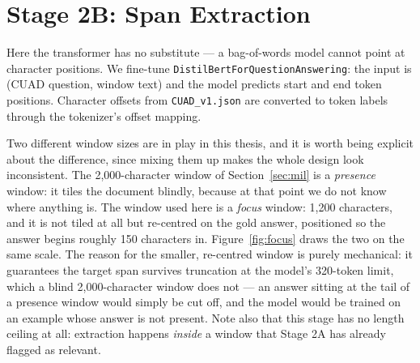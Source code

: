 \section{Stage 2B: Span Extraction}
Here the transformer has no substitute --- a bag-of-words model cannot point at character positions. We fine-tune \texttt{DistilBertForQuestionAnswering}: the input is (CUAD question, window text) and the model predicts start and end token positions. Character offsets from \texttt{CUAD\_v1.json} are converted to token labels through the tokenizer's offset mapping.

Two different window sizes are in play in this thesis, and it is worth being explicit about the difference, since mixing them up makes the whole design look inconsistent. The 2{,}000-character window of Section~\ref{sec:mil} is a \emph{presence} window: it tiles the document blindly, because at that point we do not know where anything is. The window used here is a \emph{focus} window: 1{,}200 characters, and it is not tiled at all but re-centred on the gold answer, positioned so the answer begins roughly 150 characters in. Figure~\ref{fig:focus} draws the two on the same scale. The reason for the smaller, re-centred window is purely mechanical: it guarantees the target span survives truncation at the model's 320-token limit, which a blind 2{,}000-character window does not --- an answer sitting at the tail of a presence window would simply be cut off, and the model would be trained on an example whose answer is not present. Note also that this stage has no length ceiling at all: extraction happens \emph{inside} a window that Stage 2A has already flagged as relevant.

